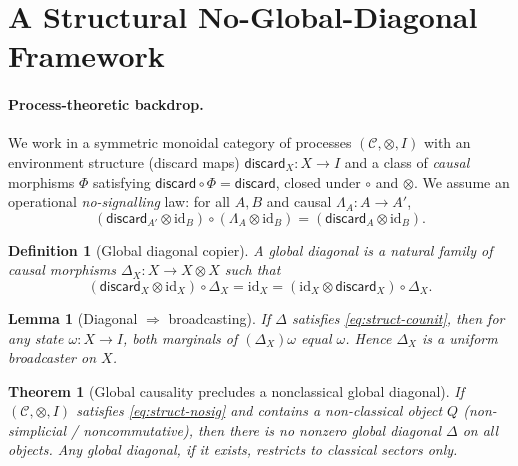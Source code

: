 \documentclass[11pt]{article}
\theoremstyle{upright}
\newtheorem{theorem}{Theorem}
\newtheorem{lemma}{Lemma}
\newtheorem{definition}{Definition}
\begin{document}
\section{A Structural No-Global-Diagonal Framework}
\label{sec:structural-noglobal}

\paragraph{Process-theoretic backdrop.}
We work in a symmetric monoidal category of processes $(\mathcal{C},\otimes,I)$ with an environment structure (discard maps) $\mathsf{discard}_X:X\to I$ and a class of \emph{causal} morphisms $\Phi$ satisfying $\mathsf{discard}\circ \Phi=\mathsf{discard}$, closed under $\circ$ and $\otimes$. We assume an operational \emph{no-signalling} law: for all $A,B$ and causal $\Lambda_A:A\!\to\!A'$,
\begin{equation}\label{eq:struct-nosig}
(\mathsf{discard}_{A'}\!\otimes\!\mathrm{id}_B)\circ(\Lambda_A\!\otimes\!\mathrm{id}_B)
=
(\mathsf{discard}_{A}\!\otimes\!\mathrm{id}_B).
\end{equation}

\begin{definition}[Global diagonal copier]
\label{def:struct-diagonal}
A \emph{global diagonal} is a natural family of causal morphisms $\Delta_X:X\to X\otimes X$ such that
\begin{equation}\label{eq:struct-counit}
(\mathsf{discard}_X\!\otimes\!\mathrm{id}_X)\circ\Delta_X=\mathrm{id}_X
=
(\mathrm{id}_X\!\otimes\!\mathsf{discard}_X)\circ\Delta_X.
\end{equation}
\end{definition}

\begin{lemma}[Diagonal $\Rightarrow$ broadcasting]
\label{lem:struct-broadcast}
If $\Delta$ satisfies \eqref{eq:struct-counit}, then for any state $\omega:X\to I$, both marginals of $(\Delta_X)\omega$ equal $\omega$. Hence $\Delta_X$ is a uniform broadcaster on $X$.
\end{lemma}

\begin{theorem}[Global causality precludes a nonclassical global diagonal]
\label{thm:struct-noglobal}
If $(\mathcal{C},\otimes,I)$ satisfies \eqref{eq:struct-nosig} and contains a non-classical object $Q$ (non-simplicial / noncommutative), then there is no nonzero global diagonal $\Delta$ on all objects. Any global diagonal, if it exists, restricts to classical sectors only.
\end{theorem}
\end{document}
